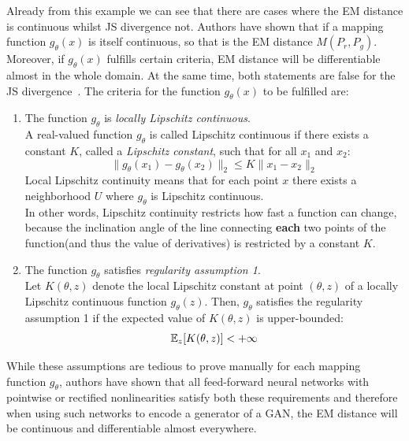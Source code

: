 Already from this example we can see that there are cases where the EM distance is continuous whilst JS divergence not. Authors have shown that if a mapping function $g_\theta(x)$ is itself continuous, so that is the EM distance $M(P_r, P_g)$. Moreover, if $g_\theta(x)$ fulfills certain criteria, EM distance will be differentiable almost in the whole domain. At the same time, both statements are false for the JS divergence~\citep{wgan}. The criteria for the function $g_\theta(x)$ to be fulfilled are:
\begin{enumerate}
	\item The function $g_\theta$ is \textit{locally Lipschitz continuous}. \\
	A real-valued function $g_\theta$ is called Lipschitz continuous if there exists a constant $K$, called a \textit{Lipschitz constant}, such that for all $x_1$ and $x_2$:
	\begin{equation}
		\lVert g_\theta(x_1) - g_\theta(x_2) \lVert_2 \leq K\lVert x_1 - x_2 \lVert_2
	\end{equation}  
	Local Lipschitz continuity means that for each point $x$ there exists a neighborhood $U$ where $g_\theta$ is Lipschitz continuous. \\
	In other words, Lipschitz continuity restricts how fast a function can change, because the inclination angle of the line connecting \textbf{each} two points of the function(and thus the value of derivatives) is restricted by a constant $K$. 
	\item The function $g_\theta$ satisfies \textit{regularity assumption 1}. \\
	Let $K(\theta, z)$ denote the local Lipschitz constant at point $(\theta, z)$ of a locally Lipschitz continuous function $g_\theta(z)$. Then, $g_\theta$ satisfies the regularity assumption 1 if the expected value of $K(\theta, z)$ is upper-bounded:
	\begin{equation}
		\operatorname{\mathbb{E}}_z[K(\theta, z)] < +\infty
	\end{equation}
\end{enumerate} 
While these assumptions are tedious to prove manually for each mapping function $g_\theta$, authors have shown that all feed-forward neural networks with pointwise or rectified nonlinearities satisfy both these requirements and therefore when using such networks to encode a  generator of a GAN, the EM distance will be continuous and differentiable almost everywhere.  

